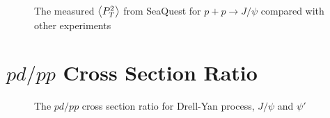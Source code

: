 \documentclass[twocolumn,aps,unsortedaddress,superscriptaddress,prd,floatfix,showpacs,linenumbers]{revtex4-2}
\begin{document}
\begin{figure}
\caption{The measured $\expval{P_T^2}$ from SeaQuest for $p+p\rightarrow J/\psi$ compared with other experiments }
\label{fig:pt_s}
\end{figure}

\section{$pd/pp$ Cross Section Ratio}
\begin{figure}
\caption{The $pd/pp$ cross section ratio for Drell-Yan process, $J/\psi$ and $\psi'$}
\label{fig:pd/pp_csr}
\end{figure}

\nocite{*}

\end{document}
